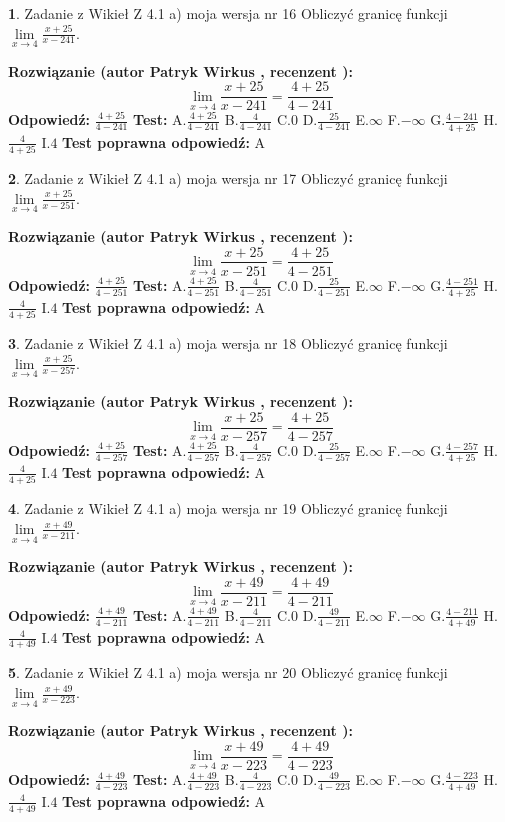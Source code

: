 \documentclass[12pt, a4paper]{article}
\theoremstyle{definition} %
\newtheorem{zad}{}
\newcommand{\zadStart}[1]{\begin{zad}#1\newline}
\newcommand{\zadStop}{\end{zad}}
\newcommand{\rozwStart}[2]{\noindent \textbf{Rozwiązanie (autor #1 , recenzent #2): }\newline}
\newcommand{\rozwStop}{\newline}
\newcommand{\odpStart}{\noindent \textbf{Odpowiedź:}\newline}
\newcommand{\odpStop}{\newline}
\newcommand{\testStart}{\noindent \textbf{Test:}\newline}
\newcommand{\testStop}{\newline}
\newcommand{\kluczStart}{\noindent \textbf{Test poprawna odpowiedź:}\newline}
\newcommand{\kluczStop}{\newline}
\begin{document}
\zadStart{Zadanie z Wikieł Z 4.1 a) moja wersja nr 16}
Obliczyć granicę funkcji $\lim\limits_{x\to4}\frac{x+25}{x-241}$.
\zadStop
\rozwStart{Patryk Wirkus}{}
$$\lim\limits_{x\to4}\frac{x+25}{x-241} = \frac{4+25}{4-241}$$
\rozwStop
\odpStart
$\frac{4+25}{4-241}$
\odpStop
\testStart
A.$\frac{4+25}{4-241}$
B.$\frac{4}{4-241}$
C.$0$
D.$\frac{25}{4-241}$
E.$\infty$
F.$-\infty$
G.$\frac{4-241}{4+25}$
H.$\frac{4}{4+25}$
I.$4$
\testStop
\kluczStart
A
\kluczStop



\zadStart{Zadanie z Wikieł Z 4.1 a) moja wersja nr 17}
Obliczyć granicę funkcji $\lim\limits_{x\to4}\frac{x+25}{x-251}$.
\zadStop
\rozwStart{Patryk Wirkus}{}
$$\lim\limits_{x\to4}\frac{x+25}{x-251} = \frac{4+25}{4-251}$$
\rozwStop
\odpStart
$\frac{4+25}{4-251}$
\odpStop
\testStart
A.$\frac{4+25}{4-251}$
B.$\frac{4}{4-251}$
C.$0$
D.$\frac{25}{4-251}$
E.$\infty$
F.$-\infty$
G.$\frac{4-251}{4+25}$
H.$\frac{4}{4+25}$
I.$4$
\testStop
\kluczStart
A
\kluczStop



\zadStart{Zadanie z Wikieł Z 4.1 a) moja wersja nr 18}
Obliczyć granicę funkcji $\lim\limits_{x\to4}\frac{x+25}{x-257}$.
\zadStop
\rozwStart{Patryk Wirkus}{}
$$\lim\limits_{x\to4}\frac{x+25}{x-257} = \frac{4+25}{4-257}$$
\rozwStop
\odpStart
$\frac{4+25}{4-257}$
\odpStop
\testStart
A.$\frac{4+25}{4-257}$
B.$\frac{4}{4-257}$
C.$0$
D.$\frac{25}{4-257}$
E.$\infty$
F.$-\infty$
G.$\frac{4-257}{4+25}$
H.$\frac{4}{4+25}$
I.$4$
\testStop
\kluczStart
A
\kluczStop



\zadStart{Zadanie z Wikieł Z 4.1 a) moja wersja nr 19}
Obliczyć granicę funkcji $\lim\limits_{x\to4}\frac{x+49}{x-211}$.
\zadStop
\rozwStart{Patryk Wirkus}{}
$$\lim\limits_{x\to4}\frac{x+49}{x-211} = \frac{4+49}{4-211}$$
\rozwStop
\odpStart
$\frac{4+49}{4-211}$
\odpStop
\testStart
A.$\frac{4+49}{4-211}$
B.$\frac{4}{4-211}$
C.$0$
D.$\frac{49}{4-211}$
E.$\infty$
F.$-\infty$
G.$\frac{4-211}{4+49}$
H.$\frac{4}{4+49}$
I.$4$
\testStop
\kluczStart
A
\kluczStop



\zadStart{Zadanie z Wikieł Z 4.1 a) moja wersja nr 20}
Obliczyć granicę funkcji $\lim\limits_{x\to4}\frac{x+49}{x-223}$.
\zadStop
\rozwStart{Patryk Wirkus}{}
$$\lim\limits_{x\to4}\frac{x+49}{x-223} = \frac{4+49}{4-223}$$
\rozwStop
\odpStart
$\frac{4+49}{4-223}$
\odpStop
\testStart
A.$\frac{4+49}{4-223}$
B.$\frac{4}{4-223}$
C.$0$
D.$\frac{49}{4-223}$
E.$\infty$
F.$-\infty$
G.$\frac{4-223}{4+49}$
H.$\frac{4}{4+49}$
I.$4$
\testStop
\kluczStart
A
\kluczStop
\end{document}
